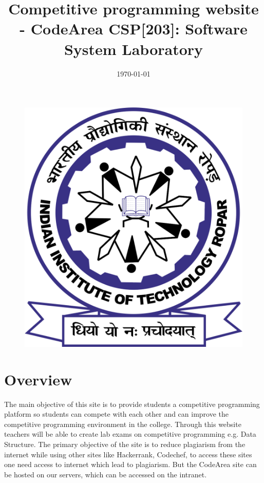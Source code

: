 \documentclass{article}
\title{Competitive programming website - CodeArea
        CSP[203]: Software System Laboratory}
\date{\today}
\begin{document}
\maketitle

\begin{table}[h!]
    \begin{center}
    \end{center}
\end{table}

\vspace{2cm}

\begin{figure}[h!]
    \centering
    \includegraphics[width=0.4\linewidth]{rpr_logo.jpg}
\end{figure}


\newpage


\section{Overview}
The main objective of this site is to provide students a competitive programming platform so students can compete with each other and can improve the competitive programming environment in the college. Through this website teachers will be able to create lab exams on competitive programming e.g. Data Structure.
The primary objective of the site is to reduce plagiarism from the internet while using other sites like Hackerrank, Codechef, to access these sites one need access to internet which lead to plagiarism. But the CodeArea site can be hosted on our servers, which can be accessed on the intranet.







\end{document}
